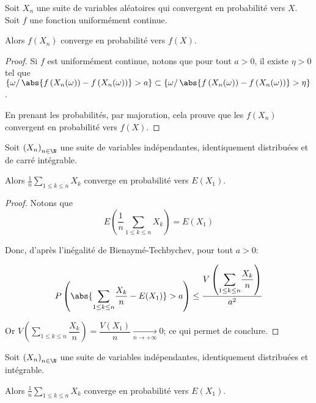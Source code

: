 \begin{prop}
Soit $X_n$ une suite de variables aléatoires qui convergent en probabilité vers $X$. Soit $f$ une fonction uniformément continue.

Alors $f(X_n)$ converge en probabilité vers $f(X)$.
\end{prop}

\begin{proof}
Si $f$ est uniformément continue, notons que pour tout $a > 0$, il existe $\eta > 0$ tel que $\left\{\omega/ \, \abs{f\left(X_n(\omega)\right)-f\left(X_n(\omega)\right)}>a \right\} \subset \left\{\omega/ \, \abs{f\left(X_n(\omega)\right)-f\left(X_n(\omega)\right)}> \eta \right\}$.

En prenant les probabilités, par majoration, cela prouve que les $f(X_n)$ convergent en probabilité vers $f(X)$.
\end{proof}

\begin{lem}
\label{loi_faible_l2}
Soit $\left(X_n\right)_{n \in \N}$ une suite de variables indépendantes, identiquement distribuées et de carré intégrable.

Alors $\frac{1}{n} \displaystyle{\sum \limits_{1 \leq k \leq n}} X_k$ converge en probabilité vers $E(X_1)$.
\end{lem}


\begin{proof}
Notons que
\[
E\left( \frac{1}{n} \displaystyle{\sum \limits_{1 \leq k \leq n}} X_k\right) = E(X_1)
\]

Donc, d'après l'inégalité de Bienaymé-Techbychev, pour tout $a>0$:

\[
P\left(\abs{\displaystyle{\sum \limits_{1 \leq k \leq n}} \dfrac{X_k}{n} - E(X_1)}>a \right) \leq \dfrac{V\left(\displaystyle{\sum \limits_{1 \leq k \leq n}} \dfrac{X_k}{n}\right)}{a^2}
\]

Or $V\left(\displaystyle{\sum \limits_{1 \leq k \leq n}} \dfrac{X_k}{n}\right) = \dfrac{V(X_1)}{n} \underset{n \to +\infty}{\longrightarrow} 0$; ce qui permet de conclure.
\end{proof}

\begin{theo}
Soit $\left(X_n\right)_{n \in \N}$ une suite de variables indépendantes, identiquement distribuées et intégrable.

Alors $\frac{1}{n} \displaystyle{\sum \limits_{1 \leq k \leq n}} X_k$ converge en probabilité vers $E(X_1)$.
\end{theo}

